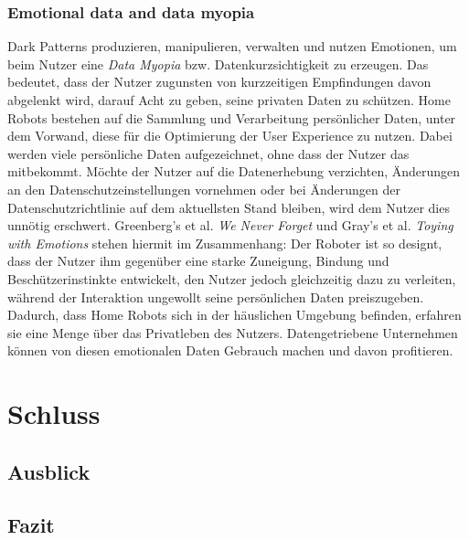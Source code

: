 \documentclass[a4paper]{article}
\begin{document}
\subsubsection{Emotional data and data myopia}
Dark Patterns produzieren, manipulieren, verwalten und nutzen Emotionen, um beim Nutzer eine \textit{Data Myopia} bzw. Datenkurzsichtigkeit zu erzeugen. Das bedeutet, dass der Nutzer zugunsten von kurzzeitigen Empfindungen davon abgelenkt wird, darauf Acht zu geben, seine privaten Daten zu schützen.
Home Robots bestehen auf die Sammlung und Verarbeitung persönlicher Daten, unter dem Vorwand, diese für die Optimierung der User Experience zu nutzen. Dabei werden viele persönliche Daten aufgezeichnet, ohne dass der Nutzer das mitbekommt. Möchte der Nutzer auf die Datenerhebung verzichten, Änderungen an den Datenschutzeinstellungen vornehmen oder bei Änderungen der Datenschutzrichtlinie auf dem aktuellsten Stand bleiben, wird dem Nutzer dies unnötig erschwert.
Greenberg's et al. \textit{We Never Forget} und Gray's et al. \textit{Toying with Emotions} stehen hiermit im Zusammenhang: Der Roboter ist so designt, dass der Nutzer ihm gegenüber eine starke Zuneigung, Bindung und Beschützerinstinkte entwickelt, den Nutzer jedoch gleichzeitig dazu zu verleiten, während der Interaktion ungewollt seine persönlichen Daten preiszugeben. Dadurch, dass Home Robots sich in der häuslichen Umgebung befinden, erfahren sie eine Menge über das Privatleben des Nutzers. Datengetriebene Unternehmen können von diesen emotionalen Daten Gebrauch machen und davon profitieren.

\section{Schluss}
\label{sec:schluss}

\subsection{Ausblick}
\label{sub:ausblick}

\subsection{Fazit}
\label{sub:fazit}


\newpage


\printbibliography

%

%
\end{document}
